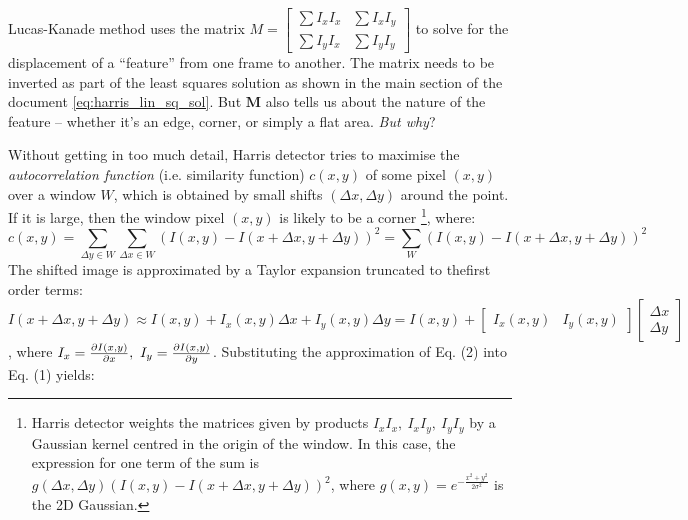 \documentclass[a4paper]{article}
\begin{document}
Lucas-Kanade method uses the matrix $M = \begin{bmatrix}    \sum I_x I_x & \sum I_xI_y \\
    \sum I_y I_x & \sum I_y I_y \end{bmatrix}$ to solve for the displacement of a ``feature'' from one frame to another. The matrix needs to be inverted as part of the least squares solution as shown in the main section of the document \eqref{eq:harris_lin_sq_sol}. But $\textbf{M}$ also tells us about the nature of the feature -- whether it's an edge, corner, or simply a flat area. \textit{But why}?

Without getting in too much detail, Harris detector tries to maximise the \textit{autocorrelation function} (i.e. similarity function) $c(x,y)$ of some pixel $(x,y)$ over a  window $W$, which is obtained by small shifts $(\Delta x, \Delta y)$ around the point. If it is large, then the window pixel $(x,y)$ is likely to be a corner \footnote{Harris detector weights the matrices given by products $I_xI_x, \ I_xI_y,\ I_yI_y$ by a Gaussian kernel centred in the origin of the window. In this case, the expression for one term of the sum is $g(\Delta x, \Delta y)\left(I(x,y) - I(x + \Delta x,y + \Delta y) \right)^2$, where $g(x,y) = e^{-\frac{x^2+y^2}{2\sigma^2}}$ is the 2D Gaussian.}, where:
\[
c(x,y) = \sum\limits_{\Delta y\in W}\sum\limits_{\Delta x\in W}\left(I(x,y) - I(x + \Delta x,y + \Delta y) \right)^2 = \sum\limits_{W}\left(I(x,y) - I(x + \Delta x,y + \Delta y) \right)^2
\tag{1}
\]
The shifted image is approximated by a Taylor expansion truncated to thefirst order terms:
\[
I(x+\Delta x, y + \Delta y) \approx I(x,y) + I_x(x,y)\Delta x + I_y(x,y)\Delta y = I(x,y) + \begin{bmatrix}I_x(x,y) & I_y(x,y)\end{bmatrix}\begin{bmatrix}\Delta x \\ \Delta y \end{bmatrix}
\tag{2}
\]
, where $I_x = \frac{\partial I(x,y)}{\partial x}, \ I_y = \frac{\partial I(x,y)}{\partial y}$.
Substituting the approximation of Eq. (2) into Eq. (1) yields:
\end{document}
